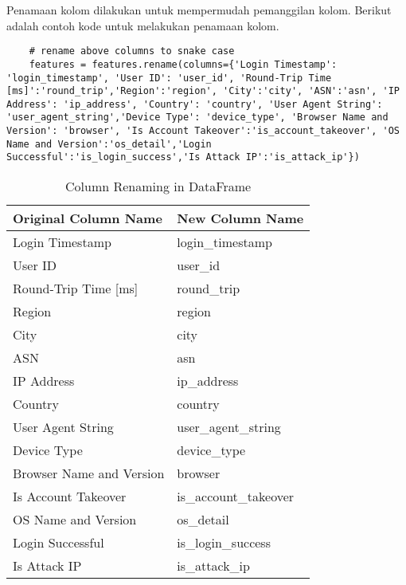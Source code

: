 Penamaan kolom dilakukan untuk mempermudah pemanggilan kolom. Berikut adalah contoh kode untuk melakukan penamaan kolom.

\begin{lstlisting}
    # rename above columns to snake case
    features = features.rename(columns={'Login Timestamp': 'login_timestamp', 'User ID': 'user_id', 'Round-Trip Time [ms]':'round_trip','Region':'region', 'City':'city', 'ASN':'asn', 'IP Address': 'ip_address', 'Country': 'country', 'User Agent String': 'user_agent_string','Device Type': 'device_type', 'Browser Name and Version': 'browser', 'Is Account Takeover':'is_account_takeover', 'OS Name and Version':'os_detail','Login Successful':'is_login_success','Is Attack IP':'is_attack_ip'})
    \end{lstlisting}

    \begin{table}[H]
        \caption{Column Renaming in DataFrame}
        \centering
        \begin{tabular}{|l|l|}
        \hline
        \textbf{Original Column Name} & \textbf{New Column Name} \\ \hline
        Login Timestamp & login\_timestamp \\ 
        User ID & user\_id \\ 
        Round-Trip Time [ms] & round\_trip \\ 
        Region & region \\ 
        City & city \\ 
        ASN & asn \\ 
        IP Address & ip\_address \\ 
        Country & country \\ 
        User Agent String & user\_agent\_string \\ 
        Device Type & device\_type \\ 
        Browser Name and Version & browser \\ 
        Is Account Takeover & is\_account\_takeover \\ 
        OS Name and Version & os\_detail \\ 
        Login Successful & is\_login\_success \\ 
        Is Attack IP & is\_attack\_ip \\ \hline
        \end{tabular}
        \label{tab:column_renaming}
        \end{table}